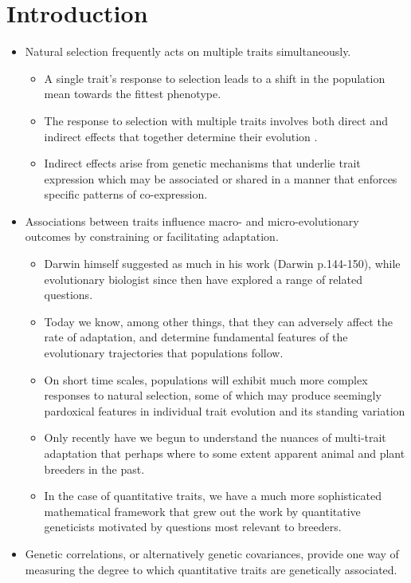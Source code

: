 \documentclass[12pt,one column]{article}
\begin{document}
\section*{Introduction}
\begin{itemize}
\item Natural selection frequently acts on multiple traits simultaneously. 
	\begin{itemize}
	\item A single trait’s response to selection leads to a shift in the population mean towards the fittest phenotype.
	\item The response to selection with multiple traits involves both direct and indirect effects that together determine their evolution \cite{Scarcelli23102007,Lovell2013,Wagner2011}.  
	\item Indirect effects arise from genetic mechanisms that underlie trait expression which may be associated or shared in a manner that enforces specific patterns of co-expression.
	\end{itemize}
\item Associations between traits influence macro- and micro-evolutionary outcomes by constraining or facilitating adaptation.
	\begin{itemize}	
	\item Darwin himself suggested as much in his work (Darwin p.144-150), while evolutionary biologist since then have explored a range of related questions.
	\item Today we know, among other things, that they can adversely affect the rate of adaptation, and determine fundamental features of the evolutionary trajectories that populations follow\cite{Felsenstein1979, Arnold2001, Arnold2008}.
	\item On short time scales, populations will exhibit much more complex responses to natural selection, some of which may produce seemingly pardoxical features in individual trait evolution and its standing variation \cite{walsh2009abundant}  
	\item Only recently have we begun to understand the nuances of multi-trait adaptation that perhaps where to some extent apparent animal and plant breeders in the past. 
	\item In the case of quantitative traits, we have a much more sophisticated mathematical framework that grew out the work by quantitative geneticists motivated by questions most relevant to breeders.
	\end{itemize}
\item Genetic correlations, or alternatively genetic covariances, provide one way of measuring the degree to which quantitative traits are genetically associated. 

\end{itemize}
\end{document}
